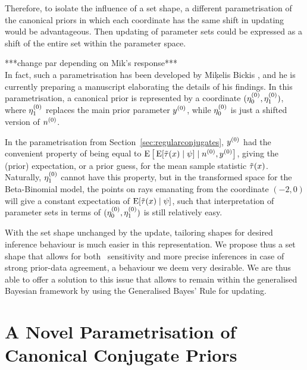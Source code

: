Therefore, to isolate the influence of a set shape,
a different parametrisation of the canonical priors
in which each coordinate has the same shift in updating
would be advantageous.
Then updating of parameter sets
could be expressed as a shift of the entire set within the parameter space.

***change par depending on Mik's response***\\
In fact, such a parametrisation has been developed by Mi\c{k}elis Bickis \cite[personal communication]{2011:bickis:geomip},
and he is currently preparing a manuscript elaborating the details of his findings.
In this parametrisation, a canonical prior is represented by a coordinate $(\eta_0^{(0)},\eta_1^{(0)})$,
where $\eta_1^{(0)}$ replaces the main prior parameter $y^{(0)}$,
while $\eta_0^{(0)}$ is just a shifted version of $n^{(0)}$.%

In the parametrisation from Section~\ref{sec:regularconjugates},
$y^{(0)}$ had the convenient property of being equal to $\operatorname{E}\big[\operatorname{E}[\tilde{\tau}(x) \mid \psi] \mid n^{(0)}, y^{(0)}\big]$,
giving the (prior) expectation, or a prior guess, for the mean sample statistic $\tilde{\tau}(x)$.
Naturally, $\eta_1^{(0)}$ cannot have this property,
but in the transformed space for the Beta-Binomial model, the points on rays emanating from the coordinate $(-2,0)$
will give a constant expectation of $\operatorname{E}[\tilde{\tau}(x) \mid \psi]$,
such that interpretation of parameter sets in terms of $(\eta_0^{(0)},\eta_1^{(0)})$ is still relatively easy.

With the set shape unchanged by the update, 
tailoring shapes for desired inference behaviour is much easier in this representation.
We propose thus a set shape %
that allows for both \pdc\ sensitivity
and more precise inferences in case of strong prior-data agreement,
a behaviour we deem very desirable.
We are thus able to offer a solution to this issue that allows to remain within the generalised Bayesian framework
by using the Generalised Bayes' Rule for updating.


\section{A Novel Parametrisation of Canonical Conjugate Priors}
\label{sec:miksworld}

